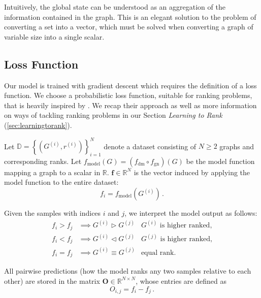 Intuitively, the global state can be understood as an aggregation of the information contained in the graph. This is an elegant solution to the problem of converting a set into a vector, which must be solved when converting a graph of variable size into a single scalar.

\subsection{Loss Function}
\label{sec:loss}

Our model is trained with gradient descent which requires the definition of a loss function. We choose a probabilistic loss function, suitable for ranking problems, that is heavily inspired by \cite{Burges:learningtorankwithsgd}. We recap their approach as well as more information on ways of tackling ranking problems in our Section \textit{Learning to Rank} (\ref{sec:learningtorank}).

Let $\mathbb{D}=\left\{\left(G^{(i)},r^{(i)}\right)\right\}_{i=1}^N$ denote a dataset consisting of $N\ge2$ graphs and corresponding ranks.
Let $f_\text{model}(G)=\left(f_\text{dm}\circ f_\text{gn}\right)\left(G\right)$ be the model function mapping a graph to a scalar in $\mathbb{R}$.
$\bm{f}\in\mathbb{R}^N$ is the vector induced by applying the model function to the entire dataset:
\begin{equation}
    f_i=f_\text{model}\left(G^{(i)}\right)\,.
\end{equation}

Given the samples with indices $i$ and $j$, we interpret the model output as follows:
\begin{align}
    f_i>f_j&\implies G^{(i)}\triangleright G^{(j)}&G^{(i)}\text{ is higher ranked,}\\
    f_i<f_j&\implies G^{(i)}\triangleleft G^{(j)}&G^{(j)}\text{ is higher ranked,}\\
    f_i=f_j&\implies G^{(i)}\equiv G^{(j)}&\text{equal rank.}
\end{align}

All pairwise predictions (how the model ranks any two samples relative to each other) are stored in the matrix $\bm{O}\in\mathbb{R}^{N\times N}$, whose entries are defined as
\begin{equation}\label{eq:outputmatrix}
    O_{i,j}=f_i-f_j\,.
\end{equation}

